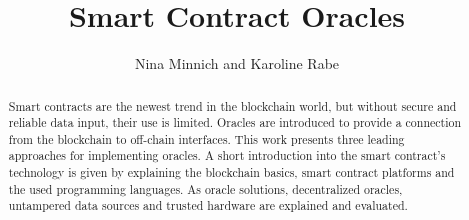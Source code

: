 \documentclass[conference]{IEEEtran}
\begin{document}
%
\title{Smart Contract Oracles}


\author{Nina Minnich and Karoline Rabe}


% 








\maketitle

\begin{abstract}
Smart contracts are the newest trend in the blockchain world, but without secure and reliable data input, their use is limited. Oracles are introduced to provide a connection from the blockchain to off-chain interfaces. This work presents three leading approaches for implementing oracles. A short introduction into the smart contract's technology is given by explaining the blockchain basics, smart contract platforms and the used programming languages. As oracle solutions, decentralized oracles, untampered data sources and trusted hardware are explained and evaluated.
\end{abstract}
\end{document}
